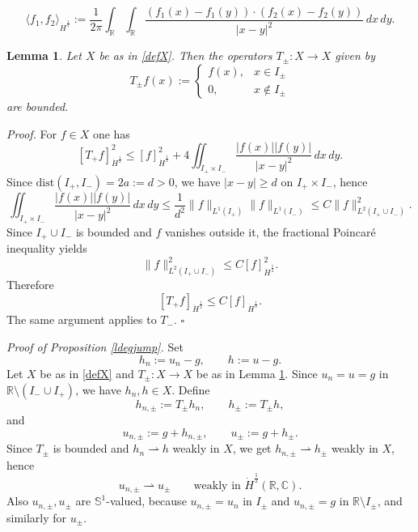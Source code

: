 \documentclass[12pt, a4paper]{article}
\newtheorem{lem}[thm]{Lemma}
\newenvironment{proof}{\noindent\emph{Proof.}}{\hfill$\square$\medskip}
\newcommand{\sph}{\mathbb{S}}
\newcommand{\R}{\mathbb{R}}
\newcommand{\blu}[1]{{\color{blue}#1}}
\newcommand{\red}[1]{{\color{red}#1}}
\renewcommand{\(}{\left(}
\renewcommand{\)}{\right)}
\begin{document}
\begin{equation}\label{scalarprod}
\langle f_1,f_2\rangle_{\dot H^{\frac12}}
:=
\frac{1}{2\pi}
\int_{\mathbb R}\int_{\mathbb R}
\frac{(f_1(x)-f_1(y))\cdot(f_2(x)-f_2(y))}
{|x-y|^2}\,dx\,dy.
\end{equation}

\begin{lem}\label{Tpm}
Let $X$ be as in \eqref{defX}. Then the operators $T_\pm : X\to X$ given by
\[
T_\pm f(x):=
\begin{cases}
f(x), & x\in I_\pm\\
0, & x\notin I_\pm
\end{cases}
\]
are bounded.
\end{lem}

\begin{proof}
For $f\in X$ one has
\[
[T_+f]_{\dot H^{\frac12}}^2
\le [f]_{\dot H^{\frac12}}^2
   +4\iint_{I_+\times I_-}\frac{|f(x)||f(y)|}{|x-y|^2}\,dx\,dy.
\]
Since $\mathrm{dist}(I_+,I_-)=2a:=d>0$, we have $|x-y|\ge d$ on $I_+\times I_-$, hence
\[
\iint_{I_+\times I_-}\frac{|f(x)||f(y)|}{|x-y|^2}\,dx\,dy
\le \frac{1}{d^2}\|f\|_{L^1(I_+)}\|f\|_{L^1(I_-)}
\le C\|f\|_{L^2(I_+\cup I_-)}^2.
\]
Since $I_+\cup I_-$ is bounded and $f$ vanishes outside it, the fractional Poincar\'e inequality yields
\[
\|f\|_{L^2(I_+\cup I_-)}^2 \le C [f]_{\dot H^{\frac12}}^2.
\]
Therefore
\[
[T_+f]_{\dot H^{\frac12}} \le C [f]_{\dot H^{\frac12}}.
\]
The same argument applies to $T_-$.
\end{proof}


\medskip


\noindent\emph{Proof of Proposition \ref{ldegjump}.}
Set
\[
        h_n:=u_n-g,
        \qquad
        h:=u-g.
\]
Let $X$ be as in \eqref{defX} and $T_\pm:X\to X$ be as in Lemma \ref{Tpm}. Since $u_n=u=g$ in $\mathbb R\setminus (I_-\cup I_+)$, we have $h_n,h\in X$. 
Define
\[
        h_{n,\pm}:=T_\pm h_n,
        \qquad
        h_\pm:=T_\pm h,
\]
and
\[
        u_{n,\pm}:=g+h_{n,\pm},
        \qquad
        u_\pm:=g+h_\pm.
\]
Since $T_\pm$ is bounded and $h_n \rightharpoonup h$ weakly in $X$, we get $h_{n,\pm} \rightharpoonup h_{\pm}$ weakly in $X$, hence
\[
        u_{n,\pm}\rightharpoonup u_\pm
        \qquad\text{weakly in } \dot H^{\frac12}(\mathbb R,\mathbb C).
\]
Also $u_{n,\pm},u_\pm$ are $\sph^1$-valued, because
$u_{n,\pm}=u_n$ in $I_\pm$ and $u_{n,\pm}=g$ in
$\mathbb R\setminus I_\pm$, and similarly for $u_\pm$.  %
\end{document}
